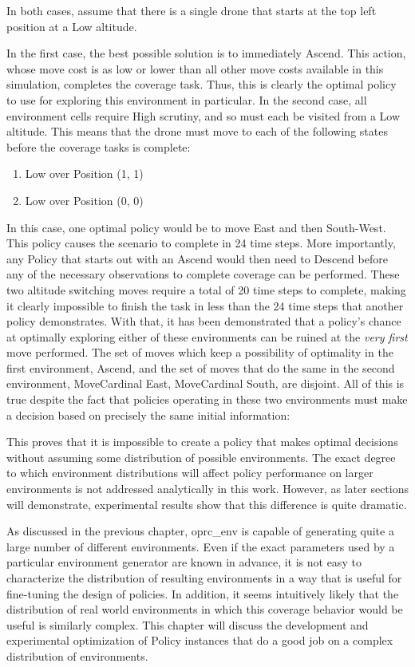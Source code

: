 

In both cases, assume that there is a single drone that starts at the top left position at a Low altitude.

In the first case, the best possible solution is to immediately Ascend. This action, whose move cost is as low or lower than all other move costs available in this simulation, completes the coverage task. Thus, this is clearly the optimal policy to use for exploring this environment in particular. In the second case, all environment cells require High scrutiny, and so must each be visited from a Low altitude. This means that the drone must move to each of the following states before the coverage tasks is complete:

\begin{enumerate}
	\item Low over Position (1, 1)
	\item Low over Position (0, 0)
\end{enumerate}

In this case, one optimal policy would be to move East and then South-West. This policy causes the scenario to complete in 24 time steps. More importantly, any Policy that starts out with an Ascend would then need to Descend before any of the necessary observations to complete coverage can be performed. These two altitude switching moves require a total of 20 time steps to complete, making it clearly impossible to finish the task in less than the 24 time steps that another policy demonstrates. With that, it has been demonstrated that a policy's chance at optimally exploring either of these environments can be ruined at the \textit{very first} move performed. The set of moves which keep a possibility of optimality in the first environment, {Ascend}, and the set of moves that do the same in the second environment, {MoveCardinal East, MoveCardinal South}, are disjoint. All of this is true despite the fact that policies operating in these two environments must make a decision based on precisely the same initial information:


This proves that it is impossible to create a policy that makes optimal decisions without assuming some distribution of possible environments. The exact degree to which environment distributions will affect policy performance on larger environments is not addressed analytically in this work. However, as later sections will demonstrate, experimental results show that this difference is quite dramatic.

As discussed in the previous chapter, oprc\_env is capable of generating quite a large number of different environments. Even if the exact parameters used by a particular environment generator are known in advance, it is not easy to characterize the distribution of resulting environments in a way that is useful for fine-tuning the design of policies. In addition, it seems intuitively likely that the distribution of real world environments in which this coverage behavior would be useful is similarly complex. This chapter will discuss the development and experimental optimization of Policy instances that do a good job on a complex distribution of environments.